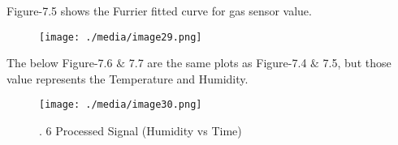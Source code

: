 \begin{enumerate}
\par


\vspace{\baselineskip}

\vspace{\baselineskip}

\vspace{\baselineskip}
\begin{justify}
Figure-7.5 shows the Furrier fitted curve for gas sensor value.
\end{justify}\par




\begin{figure}[H]
	\begin{Center}
		\texttt{[image: ./media/image29.png]}
	\end{Center}
\end{figure}



\par

\par


\vspace{\baselineskip}
\begin{justify}
The below Figure-7.6 $\&$  7.7 are the same plots as Figure-7.4 $\&$  7.5, but those value represents the Temperature and Humidity.
\end{justify}\par




\begin{figure}[H]
	\begin{Center}
		\texttt{[image: ./media/image30.png]}
		\caption{. 6 Processed Signal (Humidity vs Time)}
		\label{fig:_6_Processed_Signal_Humidity_vs_Time}
	\end{Center}
\end{figure}



\par

\par



\end{enumerate}

